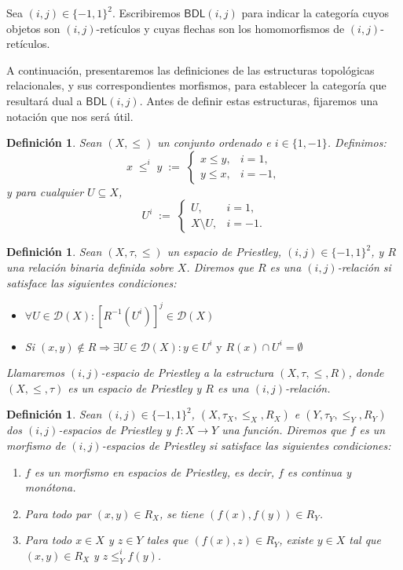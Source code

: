 \documentclass[12pt]{book}
\newtheorem{definition}[theorem]{Definición}
\newcommand{\BDL}{\mathsf{BDL}}
\begin{document}
Sea $(i,j) \in \{-1,1\}^{2}$. Escribiremos  $\BDL(i,j)$ para indicar la categoría cuyos objetos son $(i,j)$-retículos y cuyas flechas son los homomorfismos de $(i,j)$-retículos.


\vspace{0.2cm}

A continuación, presentaremos las definiciones de las estructuras topológicas relacionales, y sus correspondientes morfismos, para establecer la categoría que resultará dual a $\BDL(i,j)$. Antes de definir estas estructuras, fijaremos una notación que nos será útil.

\begin{definition}\label{def:orden-i}
Sean \((X,\le)\) un conjunto ordenado e \(i\in\{1,-1\}\). Definimos:
\[
x \;\le^i\; y
\;:=\;
\begin{cases}
x\le y,& i=1,\\
y\le x,& i=-1,
\end{cases}
\]
y para cualquier \(U\subseteq X\),
\[
U^i
\;:=\;
\begin{cases}
U,& i=1,\\
X\setminus U,& i=-1.
\end{cases}
\]
\end{definition}


\begin{definition} \label{{$(i, j)$}-Relación} Sean $(X,\tau, \leq)$ un espacio de Priestley, $(i,j) \in\{-1,1\}^{2}$, y $R$ una relación binaria definida sobre $X$. Diremos que $R$ es una {$(i, j)$}-relación si satisface las siguientes condiciones:
\begin{itemize}
    \item[1.] $\forall U\in \mathcal{D}(X): [R^{-1}(U^i)]^j\in \mathcal{D}(X)$
    \item[2.] Si $(x,y)\notin R\Rightarrow \exists U\in \mathcal{D}(X): y\in U^i\text{ y } R(x)\cap U^i=\emptyset$
\end{itemize}
Llamaremos \emph{$(i,j)$-espacio de Priestley} a la estructura $(X,\tau, \leq, R)$, donde $(X,\leq,\tau)$ es un espacio de Priestley y $R$ es una $(i,j)$-relación.
\end{definition}

\begin{definition}\label{def:morfismo-(i,j)espacio}
Sean $(i,j) \in \{-1,1\}^{2}$, $(X, \tau_X, \leq_X, R_X)$ e $(Y, \tau_Y, \leq_Y, R_Y)$ dos $(i,j)$-espacios de Priestley y $f: X \to Y$ una función. Diremos que $f$ es un morfismo de $(i,j)$-espacios de Priestley si satisface las siguientes condiciones:
\begin{enumerate}
    \item $f$ es un morfismo en espacios de Priestley, es decir, $f$ es continua y monótona.
    \item Para todo par \((x, y) \in R_X\), se tiene \((f(x), f(y)) \in R_Y\).
    \item Para todo \(x \in X\) y \(z \in Y\) tales que \((f(x), z) \in R_Y\), existe \(y \in X\) tal que \((x, y) \in R_X\) y \(z \leq^i_Y f(y) \).
\end{enumerate}
\end{definition}
\end{document}
